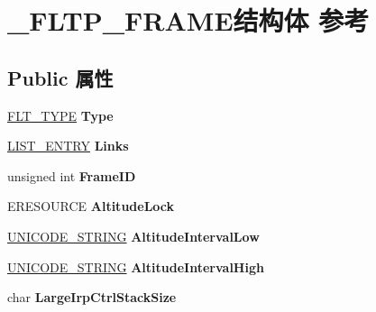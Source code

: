 \hypertarget{struct___f_l_t_p___f_r_a_m_e}{}\section{\+\_\+\+F\+L\+T\+P\+\_\+\+F\+R\+A\+M\+E结构体 参考}
\label{struct___f_l_t_p___f_r_a_m_e}
\subsection*{Public 属性}
\begin{DoxyCompactItemize}
\item 
\mbox{\label{struct___f_l_t_p___f_r_a_m_e_afd99f8648128b93a50230094705069db}} 
\hyperlink{struct___f_l_t___t_y_p_e}{F\+L\+T\+\_\+\+T\+Y\+PE} {\bfseries Type}
\item 
\mbox{\label{struct___f_l_t_p___f_r_a_m_e_a73b68132bda5122dfa0c6f5946c57da4}} 
\hyperlink{struct___l_i_s_t___e_n_t_r_y}{L\+I\+S\+T\+\_\+\+E\+N\+T\+RY} {\bfseries Links}
\item 
\mbox{\label{struct___f_l_t_p___f_r_a_m_e_accb4d8920a2ddd51c768ad375ddad4c4}} 
unsigned int {\bfseries Frame\+ID}
\item 
\mbox{\label{struct___f_l_t_p___f_r_a_m_e_a930f349329101ca495d936b6e8a5c028}} 
E\+R\+E\+S\+O\+U\+R\+CE {\bfseries Altitude\+Lock}
\item 
\mbox{\label{struct___f_l_t_p___f_r_a_m_e_ae5c9fdbbebbdbc6940dccf1bd083dbb7}} 
\hyperlink{struct___u_n_i_c_o_d_e___s_t_r_i_n_g}{U\+N\+I\+C\+O\+D\+E\+\_\+\+S\+T\+R\+I\+NG} {\bfseries Altitude\+Interval\+Low}
\item 
\mbox{\label{struct___f_l_t_p___f_r_a_m_e_aa1dba8b69cb398d9e6046cfd55f24d8f}} 
\hyperlink{struct___u_n_i_c_o_d_e___s_t_r_i_n_g}{U\+N\+I\+C\+O\+D\+E\+\_\+\+S\+T\+R\+I\+NG} {\bfseries Altitude\+Interval\+High}
\item 
\mbox{\label{struct___f_l_t_p___f_r_a_m_e_ad29c821dcf6df93fb50b063e3dccac0c}} 
char {\bfseries Large\+Irp\+Ctrl\+Stack\+Size}

\end{DoxyCompactItemize}
